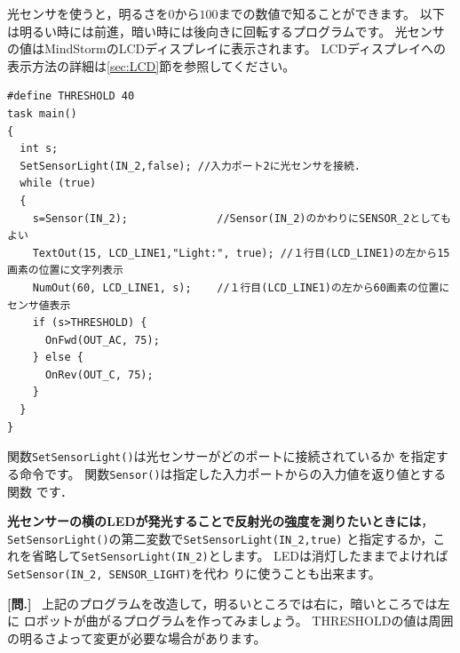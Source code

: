 \documentclass[11pt]{jarticle}
\makeatletter
\newcounter{qnum}[section]
\def\theqnum{問\thesection.\the\c@qnum}
\def\question{\refstepcounter{qnum}%
  \vspace{3mm}\noindent\textbf{[\theqnum]}~}
\makeatother
\begin{document}
光センサを使うと，明るさを$0$から$100$までの数値で知ることができます。
以下は明るい時には前進，暗い時には後向きに回転するプログラムです。
光センサの値はMindStormのLCDディスプレイに表示されます。
LCDディスプレイへの表示方法の詳細は\ref{sec:LCD}節を参照してください。
\begin{screen}{\small
\begin{verbatim}
#define THRESHOLD 40 
task main() 
{ 
  int s;
  SetSensorLight(IN_2,false); //入力ポート2に光センサを接続. 
  while (true) 
  { 
    s=Sensor(IN_2);              //Sensor(IN_2)のかわりにSENSOR_2としてもよい
    TextOut(15, LCD_LINE1,"Light:", true); //１行目(LCD_LINE1)の左から15画素の位置に文字列表示
    NumOut(60, LCD_LINE1, s);    //１行目(LCD_LINE1)の左から60画素の位置にセンサ値表示
    if (s>THRESHOLD) { 
      OnFwd(OUT_AC, 75); 
    } else {
      OnRev(OUT_C, 75); 
    }
  } 
} 
\end{verbatim}}
\end{screen}
関数\verb|SetSensorLight()|は光センサーがどのポートに接続されているか
を指定する命令です。
関数\verb|Sensor()|は指定した入力ポートからの入力値を返り値とする関数
です．

\textbf{光センサーの横のLEDが発光することで反射光の強度を測りたいときには}，
\verb|SetSensorLight()|の第二変数で\verb|SetSensorLight(IN_2,true)|
と指定するか，これを省略して\verb|SetSensorLight(IN_2)|とします。
LEDは消灯したままでよければ\verb|SetSensor(IN_2, SENSOR_LIGHT)|を代わ
りに使うことも出来ます。

\question
上記のプログラムを改造して，明るいところでは右に，暗いところでは左に
ロボットが曲がるプログラムを作ってみましょう。
THRESHOLDの値は周囲の明るさよって変更が必要な場合があります。
\end{document}
